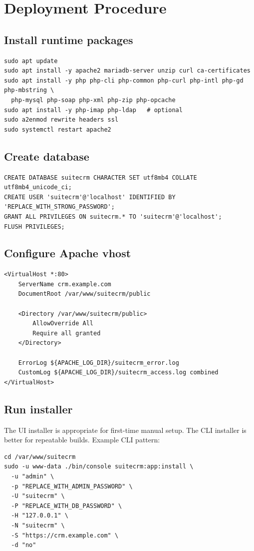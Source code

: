 \documentclass[11pt]{article}
\begin{document}
\section{Deployment Procedure}
\subsection{Install runtime packages}
\begin{verbatim}
sudo apt update
sudo apt install -y apache2 mariadb-server unzip curl ca-certificates
sudo apt install -y php php-cli php-common php-curl php-intl php-gd php-mbstring \
  php-mysql php-soap php-xml php-zip php-opcache
sudo apt install -y php-imap php-ldap   # optional
sudo a2enmod rewrite headers ssl
sudo systemctl restart apache2
\end{verbatim}

\subsection{Create database}
\begin{verbatim}
CREATE DATABASE suitecrm CHARACTER SET utf8mb4 COLLATE utf8mb4_unicode_ci;
CREATE USER 'suitecrm'@'localhost' IDENTIFIED BY 'REPLACE_WITH_STRONG_PASSWORD';
GRANT ALL PRIVILEGES ON suitecrm.* TO 'suitecrm'@'localhost';
FLUSH PRIVILEGES;
\end{verbatim}

\subsection{Configure Apache vhost}
\begin{verbatim}
<VirtualHost *:80>
    ServerName crm.example.com
    DocumentRoot /var/www/suitecrm/public

    <Directory /var/www/suitecrm/public>
        AllowOverride All
        Require all granted
    </Directory>

    ErrorLog ${APACHE_LOG_DIR}/suitecrm_error.log
    CustomLog ${APACHE_LOG_DIR}/suitecrm_access.log combined
</VirtualHost>
\end{verbatim}

\subsection{Run installer}
The UI installer is appropriate for first-time manual setup. The CLI installer is better for repeatable builds. Example CLI pattern:

\begin{verbatim}
cd /var/www/suitecrm
sudo -u www-data ./bin/console suitecrm:app:install \
  -u "admin" \
  -p "REPLACE_WITH_ADMIN_PASSWORD" \
  -U "suitecrm" \
  -P "REPLACE_WITH_DB_PASSWORD" \
  -H "127.0.0.1" \
  -N "suitecrm" \
  -S "https://crm.example.com" \
  -d "no"
\end{verbatim}
\end{document}
